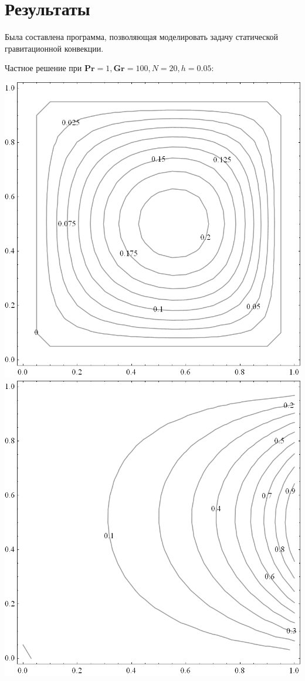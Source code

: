 \documentclass[a4paper, 12pt]{article}
\newcommand{\Pra}{\mathbf{Pr}}
\newcommand{\Gra}{\mathbf{Gr}}
\begin{document}
  \section{Результаты}
    Была составлена программа, позволяющая моделировать задачу статической
    гравитационной конвекции.

    \bigskip
    Частное решение при $\Pra = 1, \Gra = 100, N = 20, h = 0.05$:
    \bigskip

    \includegraphics[scale=0.25]{images/psi_100.png}
    \qquad
    \includegraphics[scale=0.25]{images/t_100.png}
\end{document}
